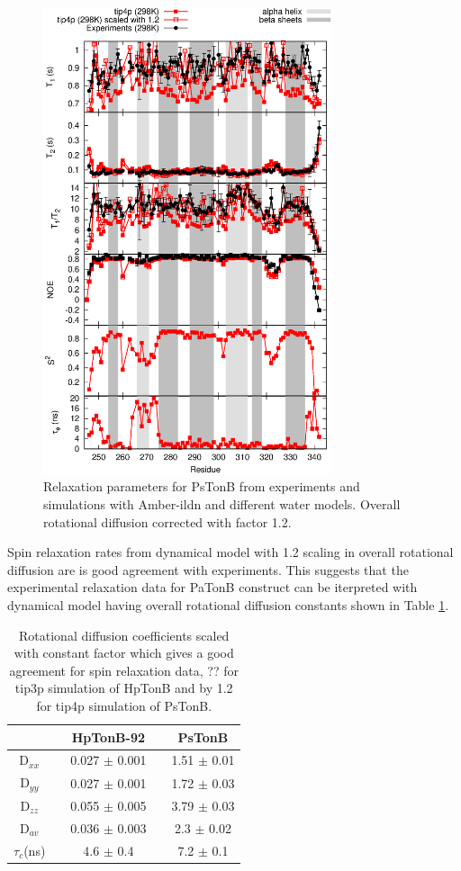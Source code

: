 \documentclass[pre,aps,floatfix,authordate1-4,twocolumn]{revtex4-1}
\begin{document}
\begin{figure}[!h]
  \includegraphics[width=8.5cm]{../Figs/PsTonBrelaxationDATAscaled.eps}%
  \caption{Relaxation parameters for PsTonB from
    experiments and simulations with Amber-ildn and different water models.
    Overall rotational diffusion corrected with factor 1.2.    
    \label{PsTonBrelaxationDATAscaled}}%
\end{figure}

Spin relaxation rates from dynamical model with 1.2 scaling in overall rotational
diffusion are is good agreement with experiments. This suggests that the experimental
relaxation data for PaTonB construct can be iterpreted with dynamical model having
overall rotational diffusion constants shown in Table \ref{ROTdiffCOEFFS}.
\begin{table}[!p]
  \centering
  \caption{Rotational diffusion coefficients scaled with constant factor which
    gives a good agreement for spin relaxation data,  ?? for tip3p simulation of HpTonB
    and by 1.2 for tip4p simulation of PsTonB.}\label{ROTdiffCOEFFS}
  \begin{tabular}{c c c c c}
    &    &  HpTonB-92  &  & PsTonB \\
    \hline
    D$_{xx}$    &   &   0.027 $\pm$ 0.001  & & 1.51  $\pm$ 0.01\\
    D$_{yy}$   &    &  0.027  $\pm$ 0.001  & & 1.72  $\pm$ 0.03\\
    D$_{zz}$   &    &  0.055   $\pm$ 0.005 & & 3.79  $\pm$ 0.03\\
    D$_{av}$  &    &   0.036  $\pm$ 0.003  & & 2.3  $\pm$ 0.02\\
    $\tau_{c}$(ns)  &    &  4.6   $\pm$ 0.4  & & 7.2 $\pm$ 0.1 \\
\end{tabular}
\end{table} 
\end{document}
